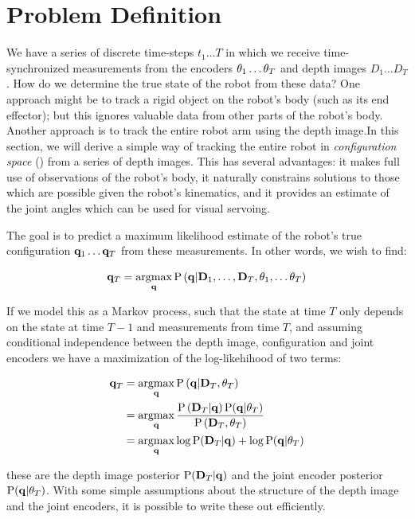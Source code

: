 \section{Problem Definition}
We have a series of discrete time-steps $t_1 \ldots T$ in which we receive time-synchronized measurements from the encoders $\theta_1 \ldots \theta_T$ and depth images $D_1 \ldots D_T$. How do we determine the true state of the robot from these data? One approach might be to track a rigid object on the robot's body (such as its end effector); but this ignores valuable data from other parts of the robot's body. Another approach is to track the entire robot arm using the depth image.In this section, we will derive a simple way of tracking the entire robot in \textit{configuration space} () from a series of depth images. This has several advantages: it makes full use of observations of the robot's body, it naturally constrains solutions to those which are possible given the robot's kinematics, and it provides an estimate of the joint angles which can be used for visual servoing.

The goal is to predict a maximum likelihood estimate of the robot's true configuration $\mathbf{q}_1 \ldots \mathbf{q}_T$ from these measurements. In other words, we wish to find:

\begin{equation}
	\config_T = \argmax_{\config} \Prob\left(\config | \DepthImage_1, \ldots, \DepthImage_T, \enc_1, \ldots \enc_T \right)
\end{equation}

If we model this as a Markov process, such that the state at time $T$ only depends on the state at time $T - 1$ and measurements from time $T$, and assuming conditional independence between the depth image, configuration and joint encoders we have a maximization of the log-likehihood of two terms:

\begin{align}
	\config_T &= \argmax_{\config} \Prob\left(\config | \DepthImage_T, \enc_T\right) \\
	          &= \argmax_{\config} \frac{\Prob\left(\DepthImage_T | \config\right) \Prob(\config | \enc_T)}{\Prob\left(\DepthImage_T, \enc_T\right)} \\
	          &= \argmax_{\config} \log \Prob(\DepthImage_T | \config) + \log \Prob(\config | \enc_T)
	          \label{eqn:dense_model_track}
\end{align} 

\noindent these are the depth image posterior $\text{P}(\mathbf{D}_T | \mathbf{q})$ and the joint encoder posterior $\text{P}(\mathbf{q} | \theta_T)$. With some simple assumptions about the structure of the depth image and the joint encoders, it is possible to write these out efficiently.


